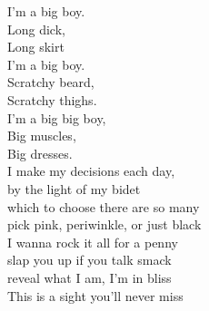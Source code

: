 I'm a big boy. \\
Long dick, \\
Long skirt \\
I'm a big boy. \\
Scratchy beard, \\
Scratchy thighs. \\
I'm a big big boy, \\
Big muscles, \\
Big dresses. \\

I make my decisions each day, \\
by the light of my bidet \\
which to choose there are so many \\
pick pink, periwinkle, or just black \\
I wanna rock it all for a penny \\
slap you up if you talk smack \\
reveal what I am, I'm in bliss \\
This is a sight you'll never miss \\

